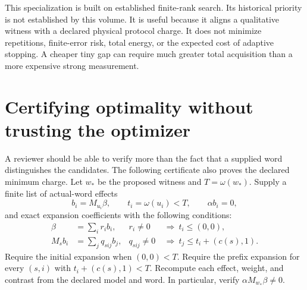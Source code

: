 This specialization is built on established finite-rank search. Its
historical priority is not established by this volume. It is useful because
it aligns a qualitative witness with a declared physical protocol charge.
It does not minimize repetitions, finite-error risk, total energy, or the
expected cost of adaptive stopping. A cheaper tiny gap can require much
greater total acquisition than a more expensive strong measurement.

\section{Certifying optimality without trusting the optimizer}

A reviewer should be able to verify more than the fact that a supplied
word distinguishes the candidates. The following certificate also proves
the declared minimum charge. Let $w_*$ be the proposed witness and
$T=\omega(w_*)$. Supply a finite list of actual-word effects
\begin{equation}
 b_i=M_{u_i}\beta,\qquad t_i=\omega(u_i)<T,
 \qquad\alpha b_i=0,
\end{equation}
and exact expansion coefficients with the following conditions:
\begin{align}
 \beta&=\sum_i r_i b_i,
 &r_i\ne0&\ \Longrightarrow\ t_i\leq(0,0),
 \label{finite:filteredbeta}\\
 M_s b_i&=\sum_j q_{sij}b_j,
 &q_{sij}\ne0&\ \Longrightarrow\
 t_j\leq t_i+(c(s),1).
 \label{finite:filteredclosure}
\end{align}
Require the initial expansion when $(0,0)<T$. Require the prefix expansion
for every $(s,i)$ with $t_i+(c(s),1)<T$. Recompute each effect, weight, and
contrast from the declared model and word. In particular, verify
$\alpha M_{w_*}\beta\ne0$.

